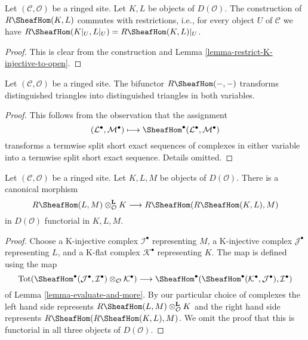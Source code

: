 \begin{lemma}
\label{lemma-restriction-RHom-to-U}
Let $(\mathcal{C}, \mathcal{O})$ be a ringed site. Let $K, L$ be objects
of $D(\mathcal{O})$. The construction of $R\SheafHom(K, L)$
commutes with restrictions, i.e.,
for every object $U$ of $\mathcal{C}$ we have
$R\SheafHom(K|_U, L|_U) = R\SheafHom(K, L)|_U$.
\end{lemma}

\begin{proof}
This is clear from the construction and
Lemma \ref{lemma-restrict-K-injective-to-open}.
\end{proof}

\begin{lemma}
\label{lemma-RHom-triangulated}
Let $(\mathcal{C}, \mathcal{O})$ be a ringed site. The bifunctor
$R\SheafHom(- , -)$ transforms distinguished triangles into
distinguished triangles in both variables.
\end{lemma}

\begin{proof}
This follows from the observation that the assignment
$$
(\mathcal{L}^\bullet, \mathcal{M}^\bullet) \longmapsto
\SheafHom^\bullet(\mathcal{L}^\bullet, \mathcal{M}^\bullet)
$$
transforms a termwise split short exact sequences of complexes in either
variable into a termwise split short exact sequence. Details omitted.
\end{proof}

\begin{lemma}
\label{lemma-internal-hom-evaluate}
Let $(\mathcal{C}, \mathcal{O})$ be a ringed site. Let $K, L, M$ be objects of
$D(\mathcal{O})$. There is a canonical morphism
$$
R\SheafHom(L, M) \otimes_\mathcal{O}^\mathbf{L} K
\longrightarrow
R\SheafHom(R\SheafHom(K, L), M)
$$
in $D(\mathcal{O})$ functorial in $K, L, M$.
\end{lemma}

\begin{proof}
Choose
a K-injective complex $\mathcal{I}^\bullet$ representing $M$,
a K-injective complex $\mathcal{J}^\bullet$ representing $L$, and
a K-flat complex $\mathcal{K}^\bullet$ representing $K$.
The map is defined using the map
$$
\text{Tot}(\SheafHom^\bullet(\mathcal{J}^\bullet,
\mathcal{I}^\bullet) \otimes_\mathcal{O} \mathcal{K}^\bullet)
\longrightarrow
\SheafHom^\bullet(\SheafHom^\bullet(\mathcal{K}^\bullet,
\mathcal{J}^\bullet), \mathcal{I}^\bullet)
$$
of Lemma \ref{lemma-evaluate-and-more}. By our particular
choice of complexes the left hand side represents
$R\SheafHom(L, M) \otimes_\mathcal{O}^\mathbf{L} K$
and the right hand side represents
$R\SheafHom(R\SheafHom(K, L), M)$. We omit the proof that
this is functorial in all three objects of $D(\mathcal{O})$.
\end{proof}

